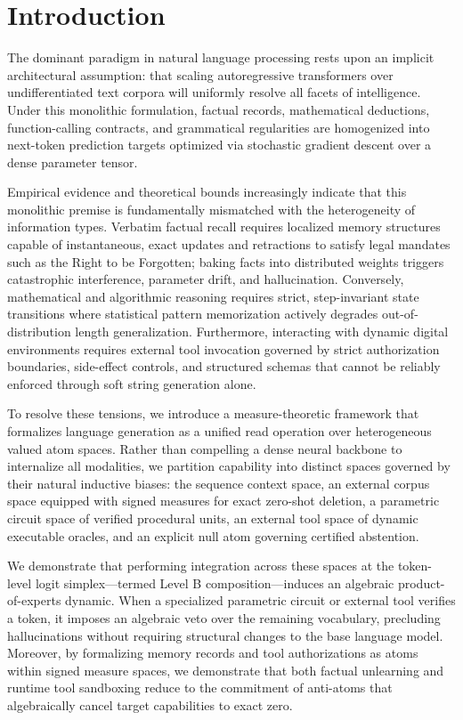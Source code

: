 \documentclass[preprint,12pt]{elsarticle}
\begin{document}
\section{Introduction}

The dominant paradigm in natural language processing rests upon an implicit architectural assumption: that scaling autoregressive transformers over undifferentiated text corpora will uniformly resolve all facets of intelligence. Under this monolithic formulation, factual records, mathematical deductions, function-calling contracts, and grammatical regularities are homogenized into next-token prediction targets optimized via stochastic gradient descent over a dense parameter tensor.

Empirical evidence and theoretical bounds increasingly indicate that this monolithic premise is fundamentally mismatched with the heterogeneity of information types. Verbatim factual recall requires localized memory structures capable of instantaneous, exact updates and retractions to satisfy legal mandates such as the Right to be Forgotten; baking facts into distributed weights triggers catastrophic interference, parameter drift, and hallucination. Conversely, mathematical and algorithmic reasoning requires strict, step-invariant state transitions where statistical pattern memorization actively degrades out-of-distribution length generalization. Furthermore, interacting with dynamic digital environments requires external tool invocation governed by strict authorization boundaries, side-effect controls, and structured schemas that cannot be reliably enforced through soft string generation alone.

To resolve these tensions, we introduce a measure-theoretic framework that formalizes language generation as a unified read operation over heterogeneous valued atom spaces. Rather than compelling a dense neural backbone to internalize all modalities, we partition capability into distinct spaces governed by their natural inductive biases:
the sequence context space,
an external corpus space equipped with signed measures for exact zero-shot deletion,
a parametric circuit space of verified procedural units,
an external tool space of dynamic executable oracles,
and an explicit null atom governing certified abstention.

We demonstrate that performing integration across these spaces at the token-level logit simplex—termed Level B composition—induces an algebraic product-of-experts dynamic. When a specialized parametric circuit or external tool verifies a token, it imposes an algebraic veto over the remaining vocabulary, precluding hallucinations without requiring structural changes to the base language model. Moreover, by formalizing memory records and tool authorizations as atoms within signed measure spaces, we demonstrate that both factual unlearning and runtime tool sandboxing reduce to the commitment of anti-atoms that algebraically cancel target capabilities to exact zero.
\end{document}
